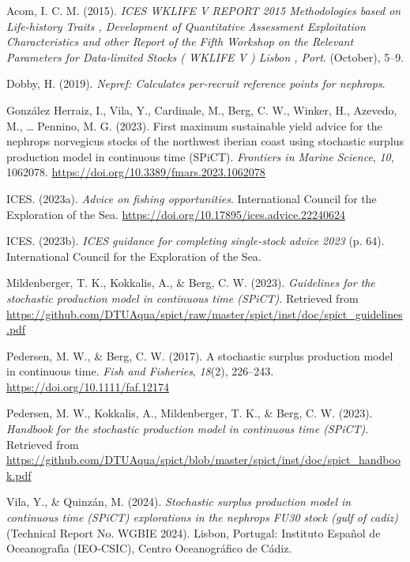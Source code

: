 \documentclass[
  12pt,
]{article}
\newlength{\cslhangindent}
\newenvironment{CSLReferences}[2] %
 {\begin{list}{}{%
  \setlength{\itemindent}{0pt}
  \setlength{\leftmargin}{0pt}
  \setlength{\parsep}{0pt}
  \ifodd #1
   \setlength{\leftmargin}{\cslhangindent}
   \setlength{\itemindent}{-1\cslhangindent}
  \fi
  \setlength{\itemsep}{#2\baselineskip}}}
 {\end{list}}
\begin{document}
\label{refs}
\begin{CSLReferences}{1}{0}
Acom, I. C. M. (2015). \emph{{ICES WKLIFE V REPORT 2015 Methodologies based on Life-history Traits , Development of Quantitative Assessment Exploitation Characteristics and other Report of the Fifth Workshop on the Relevant Parameters for Data-limited Stocks ( WKLIFE V ) Lisbon , Port}}. (October), 5--9.

Dobby, H. (2019). \emph{Nepref: Calculates per-recruit reference points for nephrops}.

González Herraiz, I., Vila, Y., Cardinale, M., Berg, C. W., Winker, H., Azevedo, M., \ldots{} Pennino, M. G. (2023). First maximum sustainable yield advice for the nephrops norvegicus stocks of the northwest iberian coast using stochastic surplus production model in continuous time (SPiCT). \emph{Frontiers in Marine Science}, \emph{10}, 1062078. \url{https://doi.org/10.3389/fmars.2023.1062078}

ICES. (2023a). \emph{Advice on fishing opportunities}. International Council for the Exploration of the Sea. \url{https://doi.org/10.17895/ices.advice.22240624}

ICES. (2023b). \emph{ICES guidance for completing single-stock advice 2023} (p. 64). International Council for the Exploration of the Sea.

Mildenberger, T. K., Kokkalis, A., \& Berg, C. W. (2023). \emph{Guidelines for the stochastic production model in continuous time (SPiCT)}. Retrieved from \url{https://github.com/DTUAqua/spict/raw/master/spict/inst/doc/spict_guidelines.pdf}

Pedersen, M. W., \& Berg, C. W. (2017). {A stochastic surplus production model in continuous time}. \emph{Fish and Fisheries}, \emph{18}(2), 226--243. \url{https://doi.org/10.1111/faf.12174}

Pedersen, M. W., Kokkalis, A., Mildenberger, T. K., \& Berg, C. W. (2023). \emph{Handbook for the stochastic production model in continuous time (SPiCT)}. Retrieved from \url{https://github.com/DTUAqua/spict/blob/master/spict/inst/doc/spict_handbook.pdf}

Vila, Y., \& Quinzán, M. (2024). \emph{Stochastic surplus production model in continuous time (SPiCT) explorations in the nephrops FU30 stock (gulf of cadiz)} (Technical Report No. WGBIE 2024). Lisbon, Portugal: Instituto Espa{ñ}ol de Oceanograf{ı́}a (IEO-CSIC), Centro Oceanogr{á}fico de C{á}diz.

\end{CSLReferences}
\end{document}
